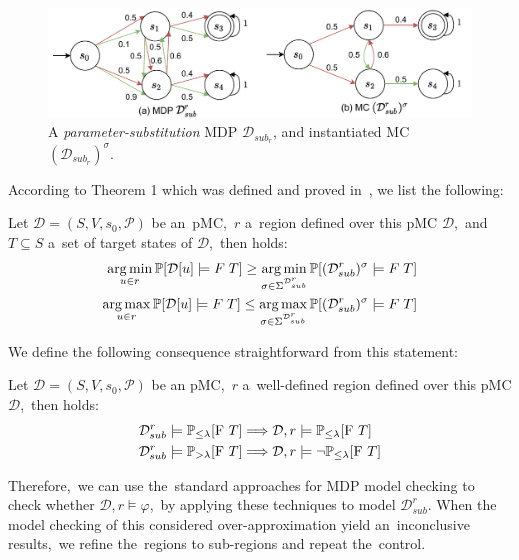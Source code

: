 \begin{figure}[h!]
\centering
\includegraphics[width=1.0\textwidth]{figures/sub_mc.pdf}
\caption{A \textit{parameter-substitution} MDP $\mathcal{D}_{sub_r}$, and instantiated MC $(\mathcal{D}_{sub_r})^\sigma$.}%
\label{fig:sub_mc}%
\end{figure}
\noindent
According to Theorem 1 which was defined and proved in~\cite{Quatmann2016}, we list the following:

\begin{theorem}[]
Let $\mathcal{D} = (S, V, s_0, \mathcal{P})$ be an~pMC,~$r$ a~region defined over this pMC $\mathcal{D}$,~and $T \subseteq S$ a~set of target states of $\mathcal{D}$,~then holds:
\begin{align*}
    \operatorname*{arg\,min}_{u \in r} \mathbb{P}[\mathcal{D}[u] \models F \; T] \geq \operatorname*{arg\,min}_{\sigma \in \Sigma^{\mathcal{D}_{sub}^{r}}} \mathbb{P}[(\mathcal{D}_{sub}^{r})^\sigma \models F \; T] \\
    \operatorname*{arg\,max}_{u \in r} \mathbb{P}[\mathcal{D}[u] \models F \; T] \leq \operatorname*{arg\,max}_{\sigma \in \Sigma^{\mathcal{D}_{sub}^{r}}} \mathbb{P}[(\mathcal{D}_{sub}^{r})^\sigma \models F \; T]
\end{align*}
\end{theorem}
\noindent
We define the following consequence straightforward from this statement:
\begin{theorem}
Let $\mathcal{D} = (S, V, s_0, \mathcal{P})$ be an pMC,~$r$ a~well-defined region defined over this pMC $\mathcal{D}$,~then holds:
\begin{align*}
    \mathcal{D}_{sub}^{r} \models \mathbb{P}_{\leq \lambda}[\mathrm{F}\ T] \Longrightarrow \mathcal{D}, r \models & \; \mathbb{P}_{\leq \lambda}[\mathrm{F}\ T] \\
    \mathcal{D}_{sub}^{r} \models \mathbb{P}_{> \lambda}[\mathrm{F}\ T] \Longrightarrow \mathcal{D}, r \models & \; \neg\mathbb{P}_{\leq \lambda}[\mathrm{F}\ T]
\end{align*}
\end{theorem}
\noindent
Therefore,~we can use the~standard approaches for MDP model checking to check whether $\mathcal{D}, r \models \varphi$,~by applying these techniques to model $\mathcal{D}_{sub}^r$.
When the model checking of this considered over-approximation yield an~inconclusive results,~we refine the~regions to sub-regions and repeat the~control.

